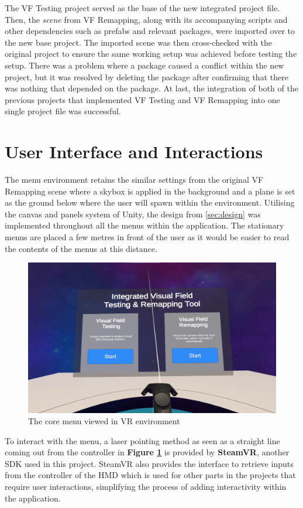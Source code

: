 \documentclass{l4proj}
\begin{document}
The VF Testing project served as the base of the new integrated project file. Then, the \textit{scene} from VF Remapping, along with its accompanying scripts and other dependencies such as prefabs and relevant packages, were imported over to the new base project. The imported scene was then cross-checked with the original project to ensure the same working setup was achieved before testing the setup. There was a problem where a package caused a conflict within the new project, but it was resolved by deleting the package after confirming that there was nothing that depended on the package. At last, the integration of both of the previous projects that implemented VF Testing and VF Remapping into one single project file was successful.

\section{User Interface and Interactions}
The menu environment retains the similar settings from the original VF Remapping scene where a skybox is applied in the background and a plane is set as the ground below where the user will spawn within the environment. Utilising the canvas and panels system of Unity, the design from \ref{sec:design} was implemented throughout all the menus within the application. The stationary menus are placed a few metres in front of the user as it would be easier to read the contents of the menus at this distance. 

\begin{figure}[!h]
    \centering
    \includegraphics[width=0.8\linewidth]{images/VRView_CORE.png}
    \caption{The core menu viewed in VR environment}
    \label{fig:coreMenuVRView}
\end{figure}

To interact with the menu, a laser pointing method as seen as a straight line coming out from the controller in \textbf{Figure \ref{fig:coreMenuVRView}} is provided by \textbf{SteamVR}, another SDK used in this project. SteamVR also provides the interface to retrieve inputs from the controller of the HMD which is used for other parts in the projects that require user interactions, simplifying the process of adding interactivity within the application.
\end{document}

